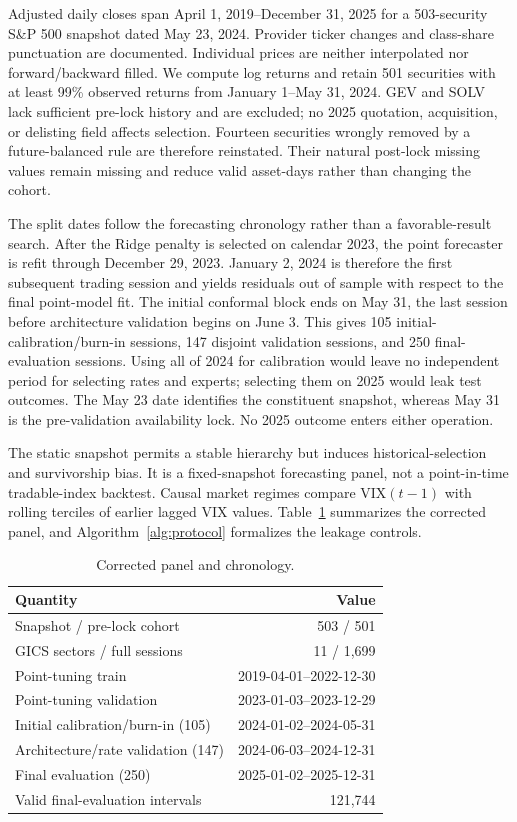 \documentclass[conference]{IEEEtran}
\begin{document}
Adjusted daily closes span April 1, 2019--December 31, 2025 for a 503-security S\&P 500 snapshot dated May 23, 2024. Provider ticker changes and class-share punctuation are documented. Individual prices are neither interpolated nor forward/backward filled. We compute log returns and retain 501 securities with at least 99\% observed returns from January 1--May 31, 2024. GEV and SOLV lack sufficient pre-lock history and are excluded; no 2025 quotation, acquisition, or delisting field affects selection. Fourteen securities wrongly removed by a future-balanced rule are therefore reinstated. Their natural post-lock missing values remain missing and reduce valid asset-days rather than changing the cohort.

The split dates follow the forecasting chronology rather than a favorable-result search. After the Ridge penalty is selected on calendar 2023, the point forecaster is refit through December 29, 2023. January 2, 2024 is therefore the first subsequent trading session and yields residuals out of sample with respect to the final point-model fit. The initial conformal block ends on May 31, the last session before architecture validation begins on June 3. This gives 105 initial-calibration/burn-in sessions, 147 disjoint validation sessions, and 250 final-evaluation sessions. Using all of 2024 for calibration would leave no independent period for selecting rates and experts; selecting them on 2025 would leak test outcomes. The May 23 date identifies the constituent snapshot, whereas May 31 is the pre-validation availability lock. No 2025 outcome enters either operation.

The static snapshot permits a stable hierarchy but induces historical-selection and survivorship bias. It is a fixed-snapshot forecasting panel, not a point-in-time tradable-index backtest. Causal market regimes compare VIX$(t-1)$ with rolling terciles of earlier lagged VIX values. Table~\ref{tab:data} summarizes the corrected panel, and Algorithm~\ref{alg:protocol} formalizes the leakage controls.

\begin{table}[t]
\centering
\caption{Corrected panel and chronology.}
\label{tab:data}
\small
\begin{tabular}{lr}
\toprule
Quantity & Value\\
\midrule
Snapshot / pre-lock cohort & 503 / 501\\
GICS sectors / full sessions & 11 / 1,699\\
Point-tuning train & 2019-04-01--2022-12-30\\
Point-tuning validation & 2023-01-03--2023-12-29\\
Initial calibration/burn-in (105) & 2024-01-02--2024-05-31\\
Architecture/rate validation (147) & 2024-06-03--2024-12-31\\
Final evaluation (250) & 2025-01-02--2025-12-31\\
Valid final-evaluation intervals & 121,744\\
\bottomrule
\end{tabular}
\end{table}
\end{document}
